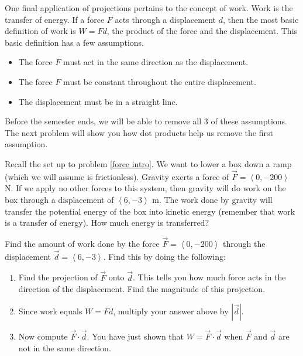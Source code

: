 One final application of projections pertains to the concept of work. Work is the transfer of energy. If a force $F$ acts through a displacement $d$, then the most basic definition of work is $W=Fd$, the product of the force and the displacement.  This basic definition has a few assumptions.
\begin{itemize}
\item The force $F$ must act in the same direction as the displacement.
\item The force $F$ must be constant throughout the entire displacement.
\item The displacement must be in a straight line.
\end{itemize}
Before the semester ends, we will be able to remove all 3 of these assumptions.  The next problem will show you how dot products help us remove the first assumption.

Recall the set up to problem \ref{force intro}.  We want to lower a box down a ramp (which we will assume is frictionless). Gravity exerts a force of $\vec F=\left<0,-200\right>$ N. If we apply no other forces to this system, then gravity will do work on the box through a displacement of $\left<6,-3\right>$ m. The work done by gravity will transfer the potential energy of the box into kinetic energy (remember that work is a transfer of energy).  How much energy is transferred?

\begin{problem} \label{first work problem}
Find the amount of work done by the force $\vec F=\left<0,-200\right>$ through the displacement $\vec d=\left<6,-3\right>$. Find this by doing the following:
\begin{enumerate}
\item Find the projection of $\vec F$ onto $\vec d$. This tells you how much force acts in the direction of the displacement. Find the magnitude of this projection.
\item Since work equals $W=Fd$, multiply your answer above by $|\vec {d}|$.  
\item Now compute $\vec F\cdot \vec d$. You have just shown that $W=\vec F\cdot \vec d$ when $\vec F$ and $\vec d$ are not in the same direction.
\end{enumerate}
\end{problem}





